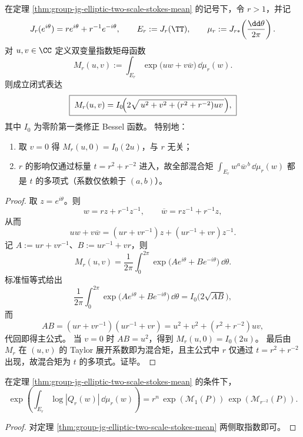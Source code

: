 \begin{theorem}\label{thm:group-jg-joukowsky-bivariate-mgf-bessel}
在定理 \ref{thm:group-jg-elliptic-two-scale-stokes-mean} 的记号下，令 \(r>1\)，并记
\[
J_r(e^{i\theta})=r e^{i\theta}+r^{-1}e^{-i\theta},
\qquad
E_r:=J_r(\TT),
\qquad
\mu_r:=J_{r\ast}\!\left(\frac{\dd\theta}{2\pi}\right).
\]
对 \(u,v\in\CC\) 定义双变量指数矩母函数
\[
M_r(u,v):=\int_{E_r}\exp\bigl(u w+v\overline w\bigr)\,\dd\mu_r(w).
\]
则成立闭式表达
\[
\boxed{\;
M_r(u,v)=I_0\!\Bigl(2\sqrt{\,u^2+v^2+(r^2+r^{-2})uv\,}\Bigr),
\;}
\]
其中 \(I_0\) 为零阶第一类修正 Bessel 函数。
特别地：
\begin{enumerate}
  \item 取 \(v=0\) 得 \(M_r(u,0)=I_0(2u)\)，与 \(r\) 无关；
  \item \(r\) 的影响仅通过标量 \(t=r^2+r^{-2}\) 进入，故全部混合矩
  \(\int_{E_r} w^a\overline w^{\,b}\,\dd\mu_r(w)\)
  都是 \(t\) 的多项式（系数仅依赖于 \((a,b)\)）。
\end{enumerate}
\end{theorem}
\begin{proof}
取 \(z=e^{i\theta}\)。则
\[
w=r z+r^{-1}z^{-1},\qquad \overline w=r z^{-1}+r^{-1}z,
\]
从而
\[
u w+v\overline w
=(ur+vr^{-1})z+(ur^{-1}+vr)z^{-1}.
\]
记 \(A:=ur+vr^{-1}\)、\(B:=ur^{-1}+vr\)，则
\[
M_r(u,v)=\frac1{2\pi}\int_0^{2\pi}\exp\!\bigl(Ae^{i\theta}+Be^{-i\theta}\bigr)\,\dd\theta.
\]
标准恒等式给出
\[
\frac1{2\pi}\int_0^{2\pi}\exp\!\bigl(Ae^{i\theta}+Be^{-i\theta}\bigr)\,\dd\theta
=I_0\!\bigl(2\sqrt{AB}\bigr),
\]
而
\[
AB=(ur+vr^{-1})(ur^{-1}+vr)=u^2+v^2+(r^2+r^{-2})uv,
\]
代回即得主公式。
当 \(v=0\) 时 \(AB=u^2\)，得到 \(M_r(u,0)=I_0(2u)\)。
最后由 \(M_r\) 在 \((u,v)\) 的 Taylor 展开系数即为混合矩，且主公式中 \(r\) 仅通过 \(t=r^2+r^{-2}\) 出现，故混合矩为 \(t\) 的多项式。证毕。
\end{proof}

\begin{corollary}[椭圆边界对数平均的乘法分解]\label{cor:group-jg-elliptic-two-scale-mahler-multiplicative}
在定理 \ref{thm:group-jg-elliptic-two-scale-stokes-mean} 的条件下，
\[
\exp\!\left(\int_{E_r}\log|Q_r(w)|\,\dd\mu_r(w)\right)
=
r^n\,\exp(\mathcal M_1(P))\,\exp(\mathcal M_{r^{-2}}(P)).
\]
\end{corollary}
\begin{proof}
对定理 \ref{thm:group-jg-elliptic-two-scale-stokes-mean} 两侧取指数即可。
\end{proof}

